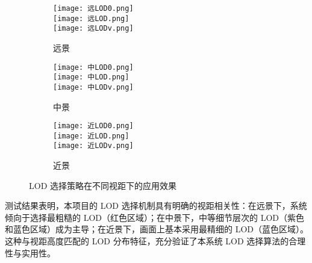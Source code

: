 \begin{figure*}[h]
    \centering
    \begin{subfigure}[b]{0.32\linewidth}
        \centering
        \texttt{[image: 远LOD0.png]}\\
        \vspace{0.1cm}
        \texttt{[image: 远LOD.png]}\\
        \vspace{0.1cm}
        \texttt{[image: 远LODv.png]}
        \caption{远景}
    \end{subfigure}%
    \hfill %
    \begin{subfigure}[b]{0.32\linewidth}
        \centering
        \texttt{[image: 中LOD0.png]}\\
        \vspace{0.1cm}
        \texttt{[image: 中LOD.png]}\\
        \vspace{0.1cm}
        \texttt{[image: 中LODv.png]}
        \caption{中景}
    \end{subfigure}%
    \hfill %
    \begin{subfigure}[b]{0.32\linewidth}
        \centering
        \texttt{[image: 近LOD0.png]}\\
        \vspace{0.1cm}
        \texttt{[image: 近LOD.png]}\\
        \vspace{0.1cm}
        \texttt{[image: 近LODv.png]}
        \caption{近景}
    \end{subfigure}
    \caption{LOD 选择策略在不同视距下的应用效果}
    \label{fig:LOD select}
\end{figure*}

测试结果表明，本项目的 LOD 选择机制具有明确的视距相关性：在远景下，系统倾向于选择最粗糙的 LOD（红色区域）；在中景下，中等细节层次的 LOD（紫色和蓝色区域）成为主导；在近景下，画面上基本采用最精细的 LOD（蓝色区域）。这种与视距高度匹配的 LOD 分布特征，充分验证了本系统 LOD 选择算法的合理性与实用性。

